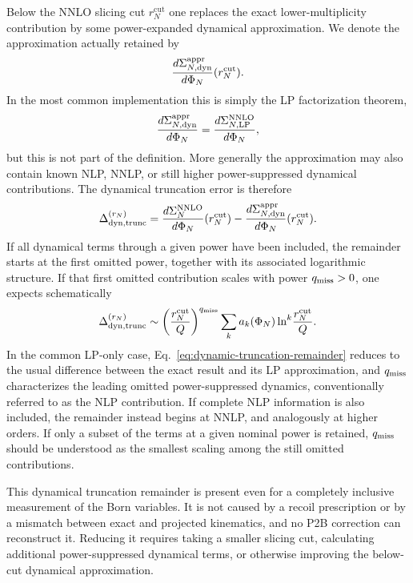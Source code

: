 \documentclass[11pt]{article}
\newcommand{\rn}{r_N}
\newcommand{\cut}{\mathrm{cut}}
\newcommand{\Ph}{\Phi}
\begin{document}
Below the NNLO slicing cut $\rn^{\cut}$ one replaces the exact lower-multiplicity contribution by some
power-expanded dynamical approximation. We denote the approximation actually retained by
\begin{equation}
\frac{d\Sigma_{N,\rm dyn}^{\rm appr}}{d\Ph_N}(\rn^{\cut}).
\label{eq:nnlo-dynamical-approximation}
\end{equation}
In the most common implementation this is simply the LP factorization theorem,
\begin{equation}
\frac{d\Sigma_{N,\rm dyn}^{\rm appr}}{d\Ph_N}
=
\frac{d\Sigma_{N,\rm LP}^{\rm NNLO}}{d\Ph_N},
\label{eq:nnlo-lp-special-case}
\end{equation}
but this is not part of the definition. More generally the approximation may also contain known NLP, NNLP,
or still higher power-suppressed dynamical contributions. 
The dynamical truncation error is therefore \begin{equation}
\Delta_{\rm dyn,trunc}^{(\rn)}
=
\frac{d\Sigma_N^{\rm NNLO}}{d\Ph_N}(\rn^{\cut})
-
\frac{d\Sigma_{N,\rm dyn}^{\rm appr}}{d\Ph_N}(\rn^{\cut}).
\label{eq:dynamic-truncation-remainder}
\end{equation}
If all dynamical terms through a given power have been included, the remainder starts at the first omitted
power, together with its associated logarithmic structure. If that first omitted contribution scales with
power $q_{\rm miss}>0$, one expects schematically
\begin{equation}
\Delta_{\rm dyn,trunc}^{(\rn)}
\sim
\left(\frac{\rn^{\cut}}{Q}\right)^{q_{\rm miss}}
\sum_k a_k(\Ph_N)\ln^k\!\frac{\rn^{\cut}}{Q}.
\label{eq:dynamic-truncation-scaling}
\end{equation}
In the common LP-only case, Eq.~\eqref{eq:dynamic-truncation-remainder} reduces to the usual difference between
the exact result and its LP approximation, and $q_{\rm miss}$ characterizes the leading omitted
power-suppressed dynamics, conventionally referred to as the NLP contribution. If complete NLP information
is also included, the remainder instead begins at NNLP, and analogously at higher orders. If only a subset of
the terms at a given nominal power is retained, $q_{\rm miss}$ should be understood as the smallest scaling
among the still omitted contributions.

This dynamical truncation remainder is present even for a completely inclusive measurement of the Born
variables. It is not caused by a recoil prescription or by a mismatch between exact and projected kinematics,
and no P2B correction can reconstruct it. Reducing it requires taking a smaller slicing cut, calculating
additional power-suppressed dynamical terms, or otherwise improving the below-cut dynamical approximation.
\end{document}
